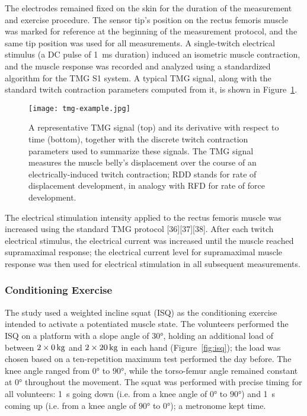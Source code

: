 \documentclass[utf8]{FrontiersinHarvard}
\begin{document}
The electrodes remained fixed on the skin for the duration of the measurement and exercise procedure.
The sensor tip's position on the rectus femoris muscle was marked for reference at the beginning of the measurement protocol, and the same tip position was used for all measurements.
A single-twitch electrical stimulus (a DC pulse of \SI{1}{\milli \second} duration) induced an isometric muscle contraction,
and the muscle response was recorded and analyzed using a standardized algorithm for the TMG S1 system.
A typical TMG signal, along with the standard twitch contraction parameters computed from it, is shown in Figure~\ref{fig:tmg_example}.

\begin{figure}
	\centering
    \texttt{[image: tmg-example.jpg]}
    \caption{A representative TMG signal (top) and its derivative with respect to time (bottom), together with the discrete twitch contraction parameters used to summarize these signals.
    The TMG signal measures the muscle belly's displacement over the course of an electrically-induced twitch contraction;
    RDD stands for rate of displacement development, in analogy with RFD for rate of force development.}
    \label{fig:tmg_example}
\end{figure}

The electrical stimulation intensity applied to the rectus femoris muscle was increased using the standard TMG protocol [36][37][38].
After each twitch electrical stimulus, the electrical current was increased until the muscle reached supramaximal response;
the electrical current level for supramaximal muscle response was then used for electrical stimulation in all subsequent measurements.

\subsubsection{Conditioning Exercise}
The study used a weighted incline squat (ISQ) as the conditioning exercise intended to activate a potentiated muscle state. 
The volunteers performed the ISQ on a platform with a slope angle of $ \ang{30} $, holding an additional load of between $ \SI[parse-numbers = false, mode = match]{2 \times 0}{\kilogram} $ and $ \SI[parse-numbers = false, mode = match]{2 \times 20}{\kilogram} $ in each hand (Figure~\ref{fig:isq});
the load was chosen based on a ten-repetition maximum test performed the day before.
The knee angle ranged from $ \ang{0} $ to $ \ang{90} $, while the torso-femur angle remained constant at $ \ang{0} $ throughout the movement.
The squat was performed with precise timing for all volunteers: \SI{1}{\second} going down (i.e. from a knee angle of $ \ang{0} $ to $ \ang{90} $) and \SI{1}{\second} coming up (i.e. from a knee angle of $ \ang{90} $ to $ \ang{0} $); a metronome kept time.
\end{document}
